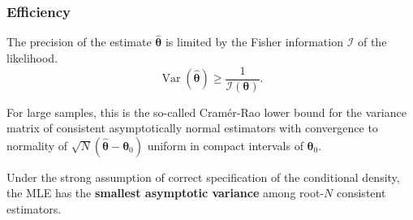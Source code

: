 \documentclass[a4paper,12pt]{article}
\begin{document}
\subsubsection*{Efficiency}
 The precision of the estimate $\hat{\boldsymbol{\theta}}$ is limited by the Fisher information $\mathcal{I}$ of the likelihood.
$$
\operatorname{Var}\left(\hat{\boldsymbol{\theta}}\right) \geq \frac{1}{\mathcal{I}\left(\boldsymbol{\theta}\right)}.
$$

For large samples, this is the so-called Cram\'{e}r-Rao lower bound for the variance matrix of consistent asymptotically normal estimators with convergence to normality of $\sqrt{N}(\hat{\boldsymbol{\theta}}-\boldsymbol{\theta}_0)$ uniform in compact intervals of $\boldsymbol{\theta}_0$.

Under the strong assumption of correct specification of the conditional density, the MLE has the \textbf{smallest asymptotic variance} among root-$N$ consistent estimators.
\end{document}
